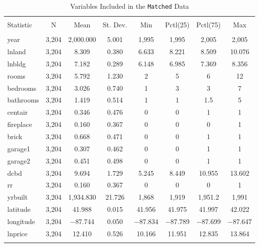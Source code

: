 \begin{table}[!htbp] \centering 
  \caption{Variables Included in the \texttt{Matched} Data} 
  \label{tab:matchdata_char} 
\begin{tabular}{@{\extracolsep{5pt}}lccccccc} 
\\[-1.8ex]\hline 
\hline \\[-1.8ex] 
Statistic & \multicolumn{1}{c}{N} & \multicolumn{1}{c}{Mean} & \multicolumn{1}{c}{St. Dev.} & \multicolumn{1}{c}{Min} & \multicolumn{1}{c}{Pctl(25)} & \multicolumn{1}{c}{Pctl(75)} & \multicolumn{1}{c}{Max} \\ 
\hline \\[-1.8ex] 
year & 3,204 & 2,000.000 & 5.001 & 1,995 & 1,995 & 2,005 & 2,005 \\ 
lnland & 3,204 & 8.309 & 0.380 & 6.633 & 8.221 & 8.509 & 10.076 \\ 
lnbldg & 3,204 & 7.182 & 0.289 & 6.148 & 6.985 & 7.369 & 8.356 \\ 
rooms & 3,204 & 5.792 & 1.230 & 2 & 5 & 6 & 12 \\ 
bedrooms & 3,204 & 3.026 & 0.740 & 1 & 3 & 3 & 7 \\ 
bathrooms & 3,204 & 1.419 & 0.514 & 1 & 1 & 1.5 & 5 \\ 
centair & 3,204 & 0.346 & 0.476 & 0 & 0 & 1 & 1 \\ 
fireplace & 3,204 & 0.160 & 0.367 & 0 & 0 & 0 & 1 \\ 
brick & 3,204 & 0.668 & 0.471 & 0 & 0 & 1 & 1 \\ 
garage1 & 3,204 & 0.307 & 0.462 & 0 & 0 & 1 & 1 \\ 
garage2 & 3,204 & 0.451 & 0.498 & 0 & 0 & 1 & 1 \\ 
dcbd & 3,204 & 9.694 & 1.729 & 5.245 & 8.449 & 10.955 & 13.602 \\ 
rr & 3,204 & 0.160 & 0.367 & 0 & 0 & 0 & 1 \\ 
yrbuilt & 3,204 & 1,934.830 & 21.726 & 1,868 & 1,919 & 1,951.2 & 1,991 \\ 
latitude & 3,204 & 41.988 & 0.015 & 41.956 & 41.975 & 41.997 & 42.022 \\ 
longitude & 3,204 & $-$87.744 & 0.050 & $-$87.834 & $-$87.789 & $-$87.699 & $-$87.647 \\ 
lnprice & 3,204 & 12.410 & 0.526 & 10.166 & 11.951 & 12.835 & 13.864 \\ 
\hline \\[-1.8ex] 
\end{tabular} 
\end{table}


